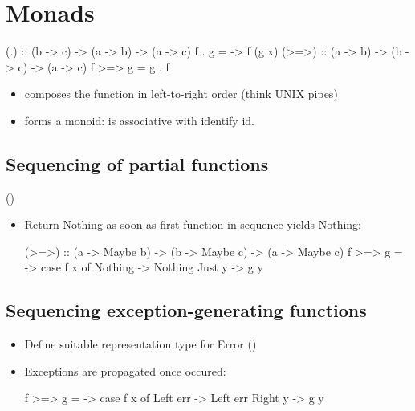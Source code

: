 

\chapter{Monads} %
\label{cha:monads}


\begin{codebox}[haskell]
(.) :: (b -> c) -> (a -> b) -> (a -> c)
f . g = \x -> f (g x)
(>=>) :: (a -> b) -> (b -> c) -> (a -> c)
f >=> g = g . f
\end{codebox}
\begin{itemize}
    \item {} composes the function in left-to-right order (think UNIX pipes)
    \item {} forms a monoid: \codeline{>=>} is associative with identify id.
\end{itemize}


\section{Sequencing of partial functions} 
()

\begin{itemize}
    \item Return Nothing as soon as first function in sequence yields Nothing:\\
        \begin{codebox}[haskell]
(>=>) :: (a -> Maybe b) -> (b -> Maybe c) -> (a -> Maybe c)
f >=> g = \x -> case f x of
        Nothing -> Nothing
        Just y  -> g y
        \end{codebox}
\end{itemize}



\section*{Sequencing exception-generating functions }

 
\begin{itemize}
    \item Define suitable representation type for Error ()
    \item Exceptions are propagated once occured:
\begin{codebox}[haskell]
f >=> g = \x -> case f x of
    Left err -> Left err
    Right y  -> g y
\end{codebox}
\end{itemize}

